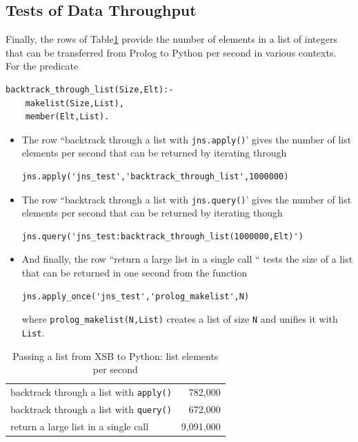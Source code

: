 \subsection{Tests of Data Throughput}
Finally, the rows of Table\ref{table:janus-py-throughput} provide the
number of elements in a list of integers that can be transferred from
Prolog to Python per second in various contexts.  For the predicate
\begin{verbatim}
backtrack_through_list(Size,Elt):-
    makelist(Size,List),
    member(Elt,List).
\end{verbatim}
\begin{itemize}
\item The row ``backtrack through a list with {\tt jns.apply()}' gives
  the number of list elements per second that can be returned by
  iterating through
\begin{verbatim}
jns.apply('jns_test','backtrack_through_list',1000000)
\end{verbatim}
\item The row ``backtrack through a list with {\tt jns.query()}' gives
  the number of list elements per second that can be returned by
  iterating though
\begin{verbatim}
jns.query('jns_test:backtrack_through_list(1000000,Elt)')
\end{verbatim}
\item And finally, the row ``return a large list in a single call ``
  tests the size of a list that can be returned in one second from the
  function
\begin{verbatim}
jns.apply_once('jns_test','prolog_makelist',N)    
\end{verbatim}
where {\tt prolog\_makelist(N,List)} creates a list of size {\tt N}
and unifies it with {\tt List}.
\end{itemize}

\begin{table}[hbt] \label{table:janus-py-throughput}
  \begin{centering}
\begin{tabular}{lr} \hline
backtrack through a list with {\tt apply()}          &   782,000\\
backtrack through a list with {\tt query()}          &   672,000 \\ 
return a large list in a single call                 & 9,091,000\\\hline 
\end{tabular}
\caption{Passing a list from XSB to Python: list elements per second}
\end{centering}
\end{table}

